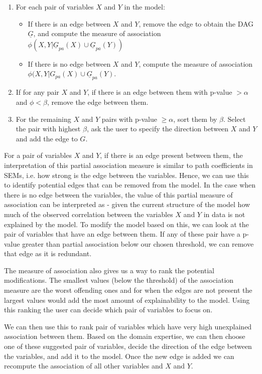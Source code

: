 \documentclass{uai2025} %
\begin{document}
\begin{enumerate}
	\item For each pair of variables $ X $ and $ Y $ in the model:
		\begin{itemize}
			\item If there is an edge between $ X $ and $ Y $, remove the edge to obtain the DAG $ \underline{G} $, and 
				compute the measure of association $ \phi(X, Y \rvert \underline{G}_{pa}(X) \cup \underline{G}_{pa}(Y)) $
			\item If there is no edge between $ X $ and $ Y $, compute the measure of association $ \phi(X, Y \rvert G_{pa}(X) \cup \underline{G}_{pa}(Y) $.
		\end{itemize}
	\item If for any pair $ X $ and $ Y $, if there is an edge between them with p-value $ > \alpha $ and $ \phi < \beta $, remove the edge between them.
	\item For the remaining $ X $ and $ Y $ pairs with p-value $ \geq \alpha $, sort them by $ \beta $. Select the pair with highest $ \beta $, ask the user to specify the direction between $ X $ and $ Y $ and add the edge to $ G $.
\end{enumerate}

For a pair of variables $ X $ and $ Y $, if there is an edge present between
them, the interpretation of this partial association measure is similar to path
coefficients in SEMs, i.e. how strong is the edge between the variables. Hence,
we can use this to identify potential edges that can be removed from the model.
In the case when there is no edge between the variables, the value of this
partial measure of association can be interpreted as - given the current
structure of the model how much of the observed correlation between the
variables $ X $ and $ Y $ in data is not explained by the model. To modify the
model based on this, we can look at the pair of variables that have an edge
between them. If any of these pair have a p-value greater than partial
association below our chosen threshold, we can remove that edge as it is
redundant.

The measure of association also gives us a way to rank the potential
modifications. The smallest values (below the threshold) of the association
measure are the worst offending ones and for when the edges are not present the
largest values would add the most amount of explainability to the model. Using
this ranking the user can decide which pair of variables to focus on.

We can then use this to rank pair of variables which have very high unexplained
association between them. Based on the domain expertise, we can then choose one
of these suggested pair of variables, decide the direction of the edge between
the variables, and add it to the model. Once the new edge is added we can
recompute the association of all other variables and $ X $ and $ Y $.
\end{document}

